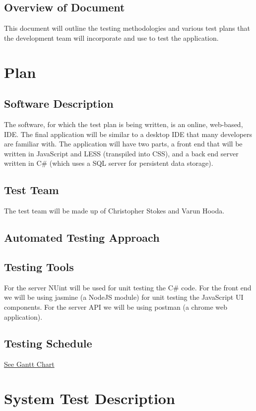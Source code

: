 \documentclass[12pt, titlepage]{article}
\begin{document}
\subsection{Overview of Document}
This document will outline the testing methodologies and various test plans
that the development team will incorporate and use to test the application.

\section{Plan}
	
\subsection{Software Description}
The software, for which the test plan is being written, is an online, web-based,
IDE. The final application will be similar to a
desktop IDE that many developers are familiar with. The application will have
two parts, a front end that will be written in JavaScript and LESS (transpiled
into CSS), and a back end server written in C\# (which uses a SQL server for
persistent data storage).

\subsection{Test Team}
The test team will be made up of Christopher Stokes and Varun Hooda.

\subsection{Automated Testing Approach}

\subsection{Testing Tools}
For the server NUint will be used for unit testing the C\# code.
For the front end we will be using jasmine (a NodeJS module) for unit testing
the JavaScript UI components.
For the server API we will be using postman (a chrome web application).

\subsection{Testing Schedule}
		
\href{../DevelopmentPlan/schedule.png}{See Gantt Chart}

\section{System Test Description}
	
\end{document}
